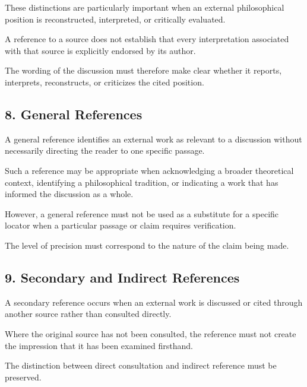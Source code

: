 These distinctions are particularly
important when an external
philosophical position is
reconstructed, interpreted,
or critically evaluated.

A reference to a source does
not establish that every
interpretation associated
with that source is explicitly
endorsed by its author.

The wording of the discussion
must therefore make clear
whether it reports, interprets,
reconstructs, or criticizes
the cited position.


\subsection*{8. General References}

A general reference identifies
an external work as relevant
to a discussion without necessarily
directing the reader to one
specific passage.

Such a reference may be appropriate
when acknowledging a broader
theoretical context, identifying
a philosophical tradition, or
indicating a work that has
informed the discussion as
a whole.

However, a general reference
must not be used as a substitute
for a specific locator when
a particular passage or claim
requires verification.

The level of precision must
correspond to the nature of
the claim being made.


\subsection*{9. Secondary and Indirect References}

A secondary reference occurs
when an external work is
discussed or cited through
another source rather than
consulted directly.

Where the original source
has not been consulted,
the reference must not create
the impression that it has
been examined firsthand.

The distinction between
direct consultation and
indirect reference must
be preserved.

